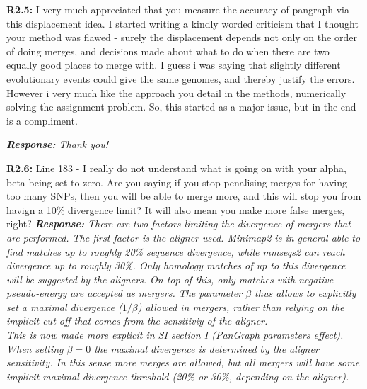 \documentclass[aps,rmp,onecolumn]{revtex4-1}
\newcommand{\Marco}[1]{{\color{gray}Marco: #1}}
\newcommand{\Liam}[1]{{\color{teal}Liam: #1}}
\newcommand{\reviewer}[2]{\textbf{#1:} #2\vskip 5mm}
\newcommand{\response}[1]{{\it {\color{response}\textbf{Response:} #1}}\vskip 5mm}
\begin{document}
\reviewer{R2.5}{I very much appreciated that you measure the accuracy of pangraph via this displacement idea. I started writing a kindly worded criticism that I thought your method was flawed - surely the displacement depends not only on the order of doing merges, and decisions made about what to do when there are two equally good places to merge with. I guess i was saying that slightly different evolutionary events could give the same genomes, and thereby justify the errors. However i very much like the approach you detail in the methods, numerically solving the assignment problem. So, this started as a major issue, but in the end is a compliment.}

\response{Thank you!}

\reviewer{R2.6}{Line 183 - I really do not understand what is going on with your alpha, beta being set to zero. Are you saying if you stop penalising merges for having too many SNPs, then you will be able to merge more, and this will stop you from havign a 10\% divergence limit? It will also mean you make more false merges, right?}
\response{There are two factors limiting the divergence of mergers that are performed. The first factor is the aligner used. Minimap2 is in general able to find matches up to roughly 20\% sequence divergence, while mmseqs2 can reach divergence up to roughly 30\%. Only homology matches of up to this divergence will be suggested by the aligners.
      On top of this, only matches with negative pseudo-energy are accepted as mergers.
      The parameter $\beta$ thus allows to explicitly set a maximal divergence ($1/\beta$) allowed in mergers, rather than relying on the implicit cut-off that comes from the sensitiviy of the aligner. \\
      This is now made more explicit in SI section I (PanGraph parameters effect).\\
      When setting $\beta = 0$ the maximal divergence is determined by the aligner sensitivity. In this sense more merges are allowed, but all mergers will have some implicit maximal divergence threshold (20\% or 30\%, depending on the aligner).}
\end{document}

